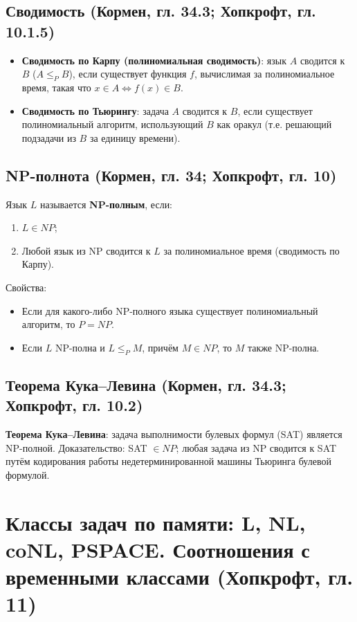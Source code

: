 \documentclass[a4paper,12pt]{article}
\begin{document}
\subsection{Сводимость (Кормен, гл. 34.3; Хопкрофт, гл. 10.1.5)}
\begin{itemize}
    \item \textbf{Сводимость по Карпу (полиномиальная сводимость)}: язык \( A \) сводится к \( B \) (\( A \le_P B \)), если существует функция \( f \), вычислимая за полиномиальное время, такая что \( x\in A \iff f(x)\in B \).
    \item \textbf{Сводимость по Тьюрингу}: задача \( A \) сводится к \( B \), если существует полиномиальный алгоритм, использующий \( B \) как оракул (т.е. решающий подзадачи из \( B \) за единицу времени).
\end{itemize}

\subsection{NP-полнота (Кормен, гл. 34; Хопкрофт, гл. 10)}
Язык \( L \) называется \textbf{NP-полным}, если:
\begin{enumerate}
    \item \( L\in NP \);
    \item Любой язык из NP сводится к \( L \) за полиномиальное время (сводимость по Карпу).
\end{enumerate}
Свойства:
\begin{itemize}
    \item Если для какого-либо NP-полного языка существует полиномиальный алгоритм, то \( P=NP \).
    \item Если \( L \) NP-полна и \( L \le_P M \), причём \( M\in NP \), то \( M \) также NP-полна.
\end{itemize}

\subsection{Теорема Кука–Левина (Кормен, гл. 34.3; Хопкрофт, гл. 10.2)}
\textbf{Теорема Кука–Левина}: задача выполнимости булевых формул (SAT) является NP-полной. Доказательство: SAT \( \in NP \); любая задача из NP сводится к SAT путём кодирования работы недетерминированной машины Тьюринга булевой формулой.

\section{Классы задач по памяти: L, NL, coNL, PSPACE. Соотношения с временными классами (Хопкрофт, гл. 11)}
\end{document}
